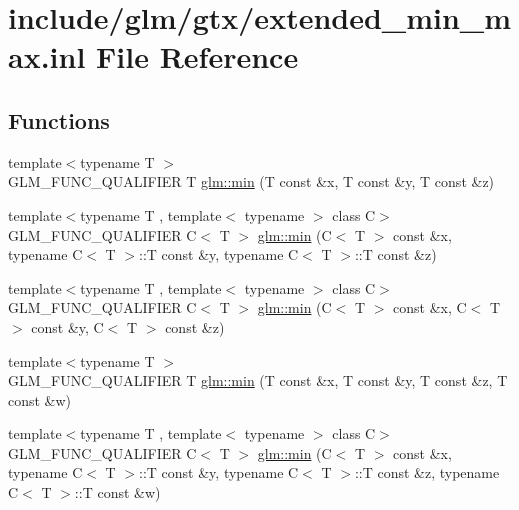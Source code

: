 \hypertarget{extended__min__max_8inl}{}\section{include/glm/gtx/extended\+\_\+min\+\_\+max.inl File Reference}
\label{extended__min__max_8inl}
\subsection*{Functions}
\begin{DoxyCompactItemize}
\item 
{\footnotesize template$<$typename T $>$ }\\G\+L\+M\+\_\+\+F\+U\+N\+C\+\_\+\+Q\+U\+A\+L\+I\+F\+I\+ER T \hyperlink{group__gtx__extented__min__max_ga713d3f9b3e76312c0d314e0c8611a6a6}{glm\+::min} (T const \&x, T const \&y, T const \&z)
\item 
{\footnotesize template$<$typename T , template$<$ typename $>$ class C$>$ }\\G\+L\+M\+\_\+\+F\+U\+N\+C\+\_\+\+Q\+U\+A\+L\+I\+F\+I\+ER C$<$ T $>$ \hyperlink{group__gtx__extented__min__max_ga74d1a96e7cdbac40f6d35142d3bcbbd4}{glm\+::min} (C$<$ T $>$ const \&x, typename C$<$ T $>$\+::T const \&y, typename C$<$ T $>$\+::T const \&z)
\item 
{\footnotesize template$<$typename T , template$<$ typename $>$ class C$>$ }\\G\+L\+M\+\_\+\+F\+U\+N\+C\+\_\+\+Q\+U\+A\+L\+I\+F\+I\+ER C$<$ T $>$ \hyperlink{group__gtx__extented__min__max_ga42b5c3fc027fd3d9a50d2ccc9126d9f0}{glm\+::min} (C$<$ T $>$ const \&x, C$<$ T $>$ const \&y, C$<$ T $>$ const \&z)
\item 
{\footnotesize template$<$typename T $>$ }\\G\+L\+M\+\_\+\+F\+U\+N\+C\+\_\+\+Q\+U\+A\+L\+I\+F\+I\+ER T \hyperlink{group__gtx__extented__min__max_ga95466987024d03039607f09e69813d69}{glm\+::min} (T const \&x, T const \&y, T const \&z, T const \&w)
\item 
{\footnotesize template$<$typename T , template$<$ typename $>$ class C$>$ }\\G\+L\+M\+\_\+\+F\+U\+N\+C\+\_\+\+Q\+U\+A\+L\+I\+F\+I\+ER C$<$ T $>$ \hyperlink{group__gtx__extented__min__max_ga4fe35dd31dd0c45693c9b60b830b8d47}{glm\+::min} (C$<$ T $>$ const \&x, typename C$<$ T $>$\+::T const \&y, typename C$<$ T $>$\+::T const \&z, typename C$<$ T $>$\+::T const \&w)
\item 

\end{DoxyCompactItemize}
